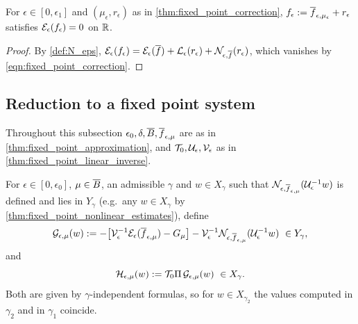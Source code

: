 \begin{lemma}
  \label{lem:c02_profile_solves}
  For $\epsilon\in[0,\epsilon_1]$ and $(\mu_\epsilon,r_\epsilon)$ as in \cref{thm:fixed_point_correction},
  $f_\epsilon:=\overline{f}_{\epsilon,\mu_\epsilon}+r_\epsilon$ satisfies $\mathcal{E}_\epsilon(f_\epsilon)=0$ on $\mathbb{R}$.
\end{lemma}
\begin{proof}
  By \cref{def:N_eps}, $\mathcal{E}_\epsilon(f_\epsilon)=\mathcal{E}_\epsilon(\overline{f})+\mathcal{L}_\epsilon(r_\epsilon)+\mathcal{N}_{\epsilon,\overline{f}}(r_\epsilon)$, which vanishes by \eqref{eqn:fixed_point_correction}.
\end{proof}

\subsection{Reduction to a fixed point system}

Throughout this subsection $\epsilon_0,\delta,\overline{B},\overline{f}_{\epsilon,\mu}$ are as in \cref{thm:fixed_point_approximation}, and
$\mathcal{T}_0,\mathcal{U}_\epsilon,\mathcal{V}_\epsilon$ as in \cref{thm:fixed_point_linear_inverse}.

\begin{definition}
  \label{def:c02_forcing_map}
  For $\epsilon\in[0,\epsilon_0]$, $\mu\in\overline{B}$, an admissible $\gamma$ and $w\in X_\gamma$ such that $\mathcal{N}_{\epsilon,\overline{f}_{\epsilon,\mu}}(\mathcal{U}_\epsilon^{-1}w)$
  is defined and lies in $Y_\gamma$ (e.g.\ any $w\in X_\gamma$ by \cref{thm:fixed_point_nonlinear_estimates}), define
  \begin{equation}\label{eqn:fixed_point_forcing}
    \mathcal{G}_{\epsilon,\mu}(w):=-\bigl[\mathcal{V}_\epsilon^{-1}\mathcal{E}_\epsilon(\overline{f}_{\epsilon,\mu})-G_\mu\bigr]-\mathcal{V}_\epsilon^{-1}\mathcal{N}_{\epsilon,\overline{f}_{\epsilon,\mu}}(\mathcal{U}_\epsilon^{-1}w)\ \in Y_\gamma,
  \end{equation}
  and
  \begin{equation}\label{eqn:fixed_point_map}
    \mathcal{H}_{\epsilon,\mu}(w):=\mathcal{T}_0\Pi\,\mathcal{G}_{\epsilon,\mu}(w)\ \in X_\gamma .
  \end{equation}
  Both are given by $\gamma$-independent formulas, so for $w\in X_{\gamma_2}$ the values computed in $\gamma_2$ and in $\gamma_1$ coincide.
\end{definition}

